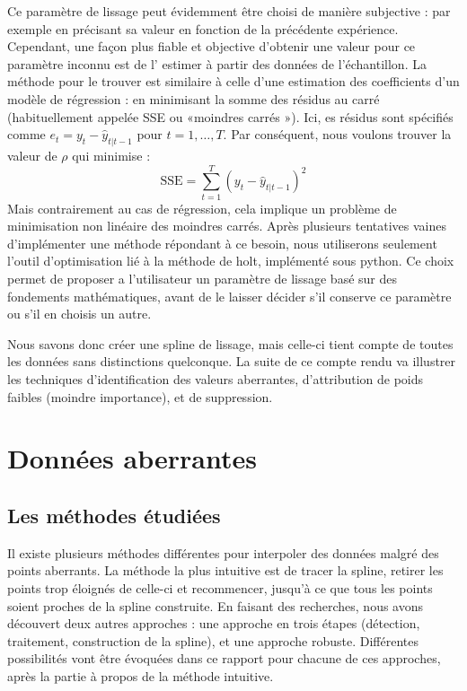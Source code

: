 \documentclass[a4paper,12pt]{article} %
\begin{document}
                Ce  paramètre de lissage peut évidemment être choisi de manière subjective : par exemple en précisant sa valeur en fonction de la précédente expérience. Cependant, une façon plus fiable et objective d’obtenir une valeur pour ce paramètre inconnu est de l' estimer à partir des données de l'échantillon. La méthode pour le trouver est similaire à celle d'une estimation des coefficients d’un modèle de régression :  en minimisant la somme des résidus au carré (habituellement appelée SSE ou «moindres carrés »).  Ici, es résidus sont spécifiés comme $e_t=y_t - \hat{y}_{t|t-1}$ pour $t=1,\dots,T$. Par conséquent, nous voulons trouver la valeur de $\rho$ qui minimise :
                \begin{equation}
                 \text{SSE}=\sum_{t=1}^T (y_t - \hat{y}_{t|t-1})^2
                \end{equation}
                Mais contrairement au cas de régression, cela implique un problème de minimisation non linéaire des moindres carrés.
                Après plusieurs tentatives vaines d'implémenter une méthode répondant à ce besoin, nous utiliserons seulement  l'outil d’optimisation lié à la méthode de holt, implémenté sous python. Ce choix permet de proposer a l'utilisateur un paramètre de lissage basé sur des fondements mathématiques, avant de le laisser décider s'il conserve ce paramètre ou s'il en choisis un autre.
                
                Nous savons donc créer une spline de lissage, mais celle-ci tient compte de toutes les données sans distinctions quelconque. La suite de ce compte rendu va illustrer les techniques d'identification des valeurs aberrantes, d'attribution de poids faibles (moindre importance), et de suppression.


	\section{Données aberrantes}

		\subsection{Les méthodes étudiées}
		   	Il existe plusieurs méthodes différentes pour interpoler des données malgré des points aberrants. La méthode la plus intuitive est de tracer la spline, retirer les points trop éloignés de celle-ci et recommencer, jusqu'à ce que tous les points soient proches de la spline construite. En faisant des recherches, nous avons découvert deux autres approches : une approche en trois étapes (détection, traitement, construction de la spline), et une approche robuste. Différentes possibilités vont être évoquées dans ce rapport pour chacune de ces approches, après la partie à propos de la méthode intuitive.
            
\end{document}
